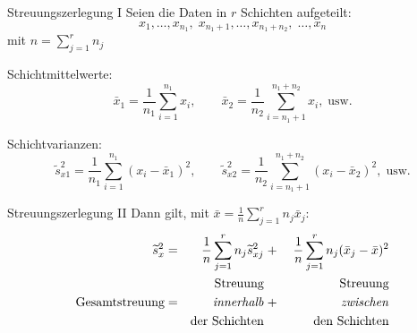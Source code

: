 \documentclass[
  10pt,
  ignorenonframetext,
]{beamer}
\begin{document}
\begin{frame}{Streuungszerlegung I}
\label{streuungszerlegung-i}
Seien die Daten in \(r\) Schichten aufgeteilt: \begin{equation*}
  x_1,\ldots,x_{n_1},\; x_{n_1+1},\ldots,x_{n_1+n_2},\; \ldots,x_{n}
\end{equation*} mit \(n = \sum^r_{j = 1} n_j\)

Schichtmittelwerte: \begin{equation*}
  \bar x_1 = \frac{1}{n_1} \sum_{i=1}^{n_1} x_i, \qquad
  \bar x_2 = \frac{1}{n_2} \sum_{i=n_1+1}^{n_1 + n_2} x_i, \; \text{usw.}
\end{equation*}

Schichtvarianzen: \begin{equation*}
  \widetilde s_{x1}^2 = \frac{1}{n_1}\sum_{i=1}^{n_1}(x_i - \bar x_1)^2, \qquad
  \widetilde s_{x2}^2 = \frac{1}{n_2} \sum_{i=n_1+1}^{n_1 + n_2}(x_i- \bar x_2)^2,\; \text{usw.}
\end{equation*}
\end{frame}

\begin{frame}{Streuungszerlegung II}
\label{streuungszerlegung-ii}
Dann gilt, mit \(\bar x = \frac{1}{n} \sum_{j=1}^r n_j \bar x_j\):
\begin{alignat*}{4}
  \widetilde s_x^2 &=& \frac{1}{n} \sum_{j=1}^r n_j \widetilde s_{xj}^2 &\;+\;& \frac{1}{n} \sum_{j=1}^r n_j(\bar x_j - \bar x)^2 \\
   && \text{Streuung} && \text{Streuung} \\
  \text{Gesamtstreuung} & = & \text{\emph{innerhalb}} &\;+\;& \text{\emph{zwischen}} \\
  && \text{der Schichten} && \text{den Schichten}
\end{alignat*}
\end{frame}
\end{document}
